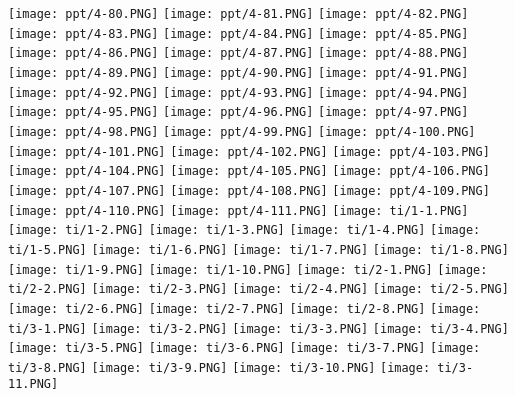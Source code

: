 \documentclass[UTF-8]{ctexart}
\begin{document}
\begin{center}
\texttt{[image: ppt/4-80.PNG]}
\texttt{[image: ppt/4-81.PNG]}
\texttt{[image: ppt/4-82.PNG]}
\texttt{[image: ppt/4-83.PNG]}
\texttt{[image: ppt/4-84.PNG]}
\texttt{[image: ppt/4-85.PNG]}
\texttt{[image: ppt/4-86.PNG]}
\texttt{[image: ppt/4-87.PNG]}
\texttt{[image: ppt/4-88.PNG]}
\texttt{[image: ppt/4-89.PNG]}
\texttt{[image: ppt/4-90.PNG]}
\texttt{[image: ppt/4-91.PNG]}
\texttt{[image: ppt/4-92.PNG]}
\texttt{[image: ppt/4-93.PNG]}
\texttt{[image: ppt/4-94.PNG]}
\texttt{[image: ppt/4-95.PNG]}
\texttt{[image: ppt/4-96.PNG]}
\texttt{[image: ppt/4-97.PNG]}
\texttt{[image: ppt/4-98.PNG]}
\texttt{[image: ppt/4-99.PNG]}
\texttt{[image: ppt/4-100.PNG]}
\texttt{[image: ppt/4-101.PNG]}
\texttt{[image: ppt/4-102.PNG]}
\texttt{[image: ppt/4-103.PNG]}
\texttt{[image: ppt/4-104.PNG]}
\texttt{[image: ppt/4-105.PNG]}
\texttt{[image: ppt/4-106.PNG]}
\texttt{[image: ppt/4-107.PNG]}
\texttt{[image: ppt/4-108.PNG]}
\texttt{[image: ppt/4-109.PNG]}
\texttt{[image: ppt/4-110.PNG]}
\texttt{[image: ppt/4-111.PNG]}
\newpage
\texttt{[image: ti/1-1.PNG]}
\texttt{[image: ti/1-2.PNG]}
\texttt{[image: ti/1-3.PNG]}
\texttt{[image: ti/1-4.PNG]}
\texttt{[image: ti/1-5.PNG]}
\texttt{[image: ti/1-6.PNG]}
\texttt{[image: ti/1-7.PNG]}
\texttt{[image: ti/1-8.PNG]}
\texttt{[image: ti/1-9.PNG]}
\texttt{[image: ti/1-10.PNG]}
\newpage
\texttt{[image: ti/2-1.PNG]}
\texttt{[image: ti/2-2.PNG]}
\texttt{[image: ti/2-3.PNG]}
\texttt{[image: ti/2-4.PNG]}
\texttt{[image: ti/2-5.PNG]}
\texttt{[image: ti/2-6.PNG]}
\texttt{[image: ti/2-7.PNG]}
\texttt{[image: ti/2-8.PNG]}
\newpage
\texttt{[image: ti/3-1.PNG]}
\texttt{[image: ti/3-2.PNG]}
\texttt{[image: ti/3-3.PNG]}
\texttt{[image: ti/3-4.PNG]}
\texttt{[image: ti/3-5.PNG]}
\texttt{[image: ti/3-6.PNG]}
\texttt{[image: ti/3-7.PNG]}
\texttt{[image: ti/3-8.PNG]}
\texttt{[image: ti/3-9.PNG]}
\texttt{[image: ti/3-10.PNG]}
\texttt{[image: ti/3-11.PNG]}

\end{center}
\end{document}
